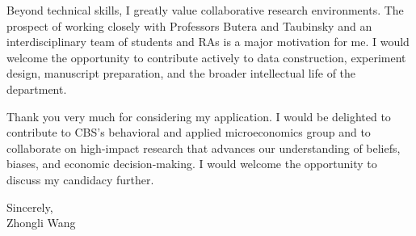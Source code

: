\documentclass[11pt]{article}
\begin{document}
Beyond technical skills, I greatly value collaborative research environments. The prospect of working closely with Professors Butera and Taubinsky and an interdisciplinary team of students and RAs is a major motivation for me. I would welcome the opportunity to contribute actively to data construction, experiment design, manuscript preparation, and the broader intellectual life of the department.

Thank you very much for considering my application. I would be delighted to contribute to CBS’s behavioral and applied microeconomics group and to collaborate on high-impact research that advances our understanding of beliefs, biases, and economic decision-making. I would welcome the opportunity to discuss my candidacy further.

\vspace{6mm}

\noindent Sincerely,\\[15mm]
\noindent Zhongli Wang
\end{document}
